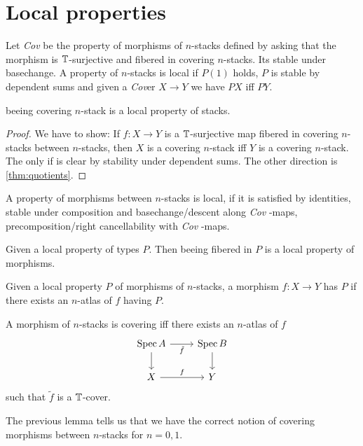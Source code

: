 \documentclass{article}
\newcommand{\Cov}{\emph{Cov} }
\newcommand{\Cover}{\emph{Cov}er }
\begin{document}
\section{Local properties}

\begin{definition}
Let \Cov be the property of morphisms of  $n$-stacks defined by asking that the morphism is $\mathbb{T}$-surjective and fibered in covering $n$-stacks. Its stable under basechange. A property of  $n$-stacks is local if $P(1)$ holds, $P$ is stable by dependent sums and given a \Cover  $X \to Y$ we have $P X$ iff $P Y$.
\end{definition}
\begin{example}    
    beeing covering $n$-stack is a local property of stacks.
\end{example}
\begin{proof}
    We have to show: If $f : X \to Y$ is a $\mathbb{T}$-surjective map fibered in covering $n$-stacks between  $n$-stacks, then $X$ is a covering $n$-stack iff $Y$ is a covering $n$-stack.
    The only if is clear by stability under dependent sums. The other direction is \ref{thm:quotients}.
    
\end{proof}

\begin{definition}
    A property of morphisms between $n$-stacks is local, if it is satisfied by identities, stable under composition and basechange/descent along \Cov-maps, precomposition/right cancellability with \Cov-maps.
\end{definition}
\begin{lemma}
    Given a local property of types $P$. Then beeing fibered in $P$ is a local property of morphisms.
\end{lemma}
\begin{lemma}[\todocite]
    Given a local property $P$ of morphisms of $n$-stacks, a morphism $f : X \to Y$ has $P$ if there exists an $n$-atlas of $f$ having $P$.
\end{lemma}
\begin{example}
    A morphism of $n$-stacks is covering iff there exists an $n$-atlas of $f$ 
\[\begin{tikzcd}
	{\Spec A} & {\Spec B} \\
	X & Y
	\arrow["{\tilde f}"', from=1-1, to=1-2]
	\arrow[from=1-1, to=2-1]
	\arrow[from=1-2, to=2-2]
	\arrow["f", from=2-1, to=2-2]
\end{tikzcd}\]
such that $\tilde f$ is a $\mathbb{T}$-cover.
\end{example}
The previous lemma tells us that we have the correct notion of covering morphisms between  $n$-stacks for $n = 0,1$.
\end{document}
